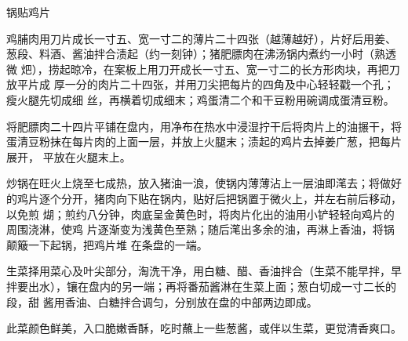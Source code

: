 \begin{recipe}{锅贴鸡片}

\ingredients


\preparation

\step 鸡脯肉用刀片成长一寸五、宽一寸二的薄片二十四张（越薄越好），片好后用姜、
葱段、料酒、酱油拌合渍起（约一刻钟）；猪肥膘肉在沸汤锅内煮约一小时（熟透微
𤆵），捞起晾冷，在案板上用刀开成长一寸五、宽一寸二的长方形肉块，再把刀放平片成
厚一分的肉片二十四张，并用刀尖把每片的四角及中心轻轻戳一个孔；瘦火腿先切成细
丝，再横着切成细末；鸡蛋清二个和干豆粉用碗调成蛋清豆粉。

\step 将肥膘肉二十四片平铺在盘内，用净布在热水中浸湿拧干后将肉片上的油搌干，将
蛋清豆粉抹在每片肉的上面一层，并放上火腿末；渍起的鸡片去掉姜广葱，把每片展开，
平放在火腿末上。

\step 炒锅在旺火上烧至七成热，放入猪油一浪，使锅内薄薄沾上一层油即滗去；将做好
的鸡片逐个分开，猪肉向下贴在锅内，贴好后把锅置于微火上，并左右前后移动，以免煎
煳；煎约八分钟，肉底呈金黄色时，将肉片化出的油用小铲轻轻向鸡片的周围浇淋，使鸡
片逐渐变为浅黄色至熟；随后滗出多余的油，再淋上香油，将锅颠簸一下起锅，把鸡片堆
在条盘的一端。

\step 生菜择用菜心及叶尖部分，淘洗干净，用白糖、醋、香油拌合（生菜不能早拌，早
拌要出水），镶在盘内的另一端；再将番茄酱淋在生菜上面；葱白切成一寸二长的段，甜
酱用香油、白糖拌合调匀，分别放在盘的中部两边即成。

\features

此菜颜色鲜美，入口脆嫩香酥，吃时蘸上一些葱酱，或伴以生菜，更觉清香爽口。

\end{recipe}

